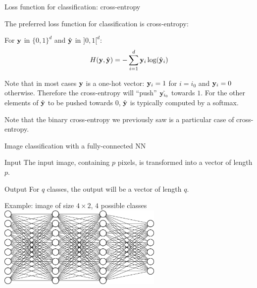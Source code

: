 \documentclass[xcolor=pdftex,dvipsnames,table,mathserif]{beamer}
\begin{document}
\begin{frame}{Loss function for classification: cross-entropy}

  The preferred loss function for classification is cross-entropy:

  \begin{block}{}
    For $\mathbf{y}$ in $\{0, 1\}^d$ and $\hat{\mathbf{y}}$ in $]0, 1[^d$:
        \[
        H(\mathbf{y}, \hat{\mathbf{y}}) = - \sum_{i=1}^d \mathbf{y}_i \log(\hat{\mathbf{y}}_i)
        \]
  \end{block}

  \pause

  Note that in most cases $\mathbf{y}$ is a one-hot vector: $\mathbf{y}_i = 1$ for $i=i_0$ and $\mathbf{y}_i=0$ otherwise. Therefore the cross-entropy will ``push'' $\hat{\mathbf{y}_{i_0}}$ towards $1$. For the other elements of $\hat{\mathbf{y}}$ to be pushed towards $0$, $\hat{\mathbf{y}}$ is typically computed by a softmax.

   \pause

  Note that the binary cross-entropy we previously saw is a particular case of cross-entropy.


\end{frame}

\begin{frame}{Image classification with a fully-connected NN}

  \begin{block}{Input}
    The input image, containing $p$ pixels, is transformed into a vector of length $p$.
  \end{block}

  \begin{block}{Output}
    For $q$ classes, the output will be a vector of length $q$.
  \end{block}

\pause

  \begin{block}{Example: image of size $4 \times 2$, $4$ possible classes}
    \centering
      \includegraphics[width=0.6\textwidth]{mini_reseau3_bis}
  \end{block}

\end{frame}
\end{document}
